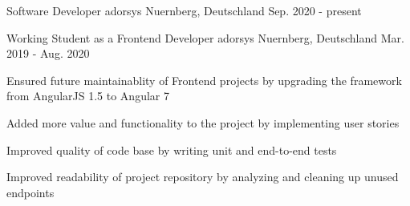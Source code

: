 
\begin{cventries}


  \cventry
    {Software Developer} %
    {adorsys} %
    {Nuernberg, Deutschland} %
    {Sep. 2020 - present} %
    {
      \begin{cvitems} %
      \end{cvitems}
    }

  \cventry
    {Working Student as a Frontend Developer} %
    {adorsys} %
    {Nuernberg, Deutschland} %
    {Mar. 2019 - Aug. 2020} %
    {
      \begin{cvitems} %
        \item {Ensured future maintainablity of Frontend projects by upgrading the framework from AngularJS 1.5 to Angular 7}
        \item {Added more value and functionality to the project by implementing user stories}
        \item {Improved quality of code base by writing unit and end-to-end tests}
        \item {Improved readability of project repository by analyzing and cleaning up unused endpoints}
      \end{cvitems}
    }

\end{cventries}

